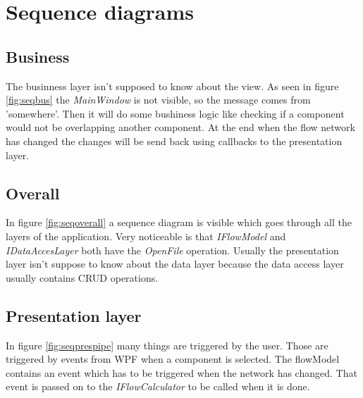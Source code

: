 \chapter{Sequence diagrams}
\section{Business}
The businness layer isn't supposed to know about the view. As seen in figure \ref{fig:seqbus} the \emph{MainWindow} is not visible, so the message comes from 'somewhere'. Then it will do some bushiness logic like checking if a component would not be overlapping another component. At the end when the flow network has changed the changes will be send back using callbacks to the presentation layer.

\section{Overall}
In figure \ref{fig:seqoverall} a sequence diagram is visible which goes through all the layers of the application. Very noticeable is that \emph{IFlowModel} and \emph{IDataAccesLayer} both have the \emph{OpenFile} operation. Usually the presentation layer isn't suppose to know about the data layer because the data access layer usually contains CRUD operations.

\section{Presentation layer}
In figure \ref{fig:seqprespipe} many things are triggered by the user. Those are triggered by events from WPF when a component is selected. The flowModel contains an event which has to be triggered when the network has changed. That event is passed on to the \emph{IFlowCalculator} to be called when it is done.

